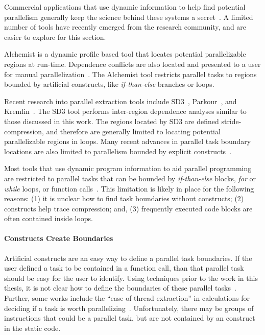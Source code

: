 {Commercial applications that use dynamic information to help find potential parallelism generally keep the science behind these systems a secret~\cite{cogswell:2010:eweek, vectorfabrics:11:ws}.  A limited number of tools have recently emerged from the research community, and are easier to explore for this section.

Alchemist is a dynamic profile based tool that locates potential parallelizable regions at run-time.  Dependence conflicts are also located and presented to a user for manual parallelization~\cite{zhang:09:cgo}.  The Alchemist tool restricts parallel tasks to regions bounded by artificial constructs, like \textit{if-than-else} branches or loops.

Recent research into parallel extraction tools include SD3~\cite{minjang:10:micro}, Parkour~\cite{jeon:2011:hotpar}, and Kremlin~\cite{garcia:2011:pldi}. The SD3 tool performs inter-region dependence analyses similar to those discussed in this work.  The regions located by SD3 are defined stride-compression, and therefore are generally limited to locating potential parallelizable regions in loops.  Many recent advances in parallel task boundary locations are also limited to parallelism bounded by explicit constructs~\cite{jeon:2011:hotpar, garcia:2011:pldi}.

Most tools that use dynamic program information to aid parallel programming are restricted to parallel tasks that can be bounded by \textit{if-than-else} blocks, \textit{for} or \textit{while} loops, or function calls~\cite{zhang:09:cgo, minjang:10:micro, jeon:2011:hotpar, garcia:2011:pldi}.  This limitation is likely in place for the following reasons: (1) it is unclear how to find task boundaries without constructs; (2) constructs help trace compression; and, (3) frequently executed code blocks are often contained inside loops.

\noindent\paragraph{Constructs Create Boundaries}

Artificial constructs are an easy way to define a parallel task boundaries.  If the user defined a task to be contained in a function call, than that parallel task should be easy for the user to identify.  Using techniques prior to the work in this thesis, it is not clear how to define the boundaries of these parallel tasks~\cite{jeon:2011:hotpar, garcia:2011:pldi}.  Further, some works include the ``ease of thread extraction'' in calculations for deciding if a task is worth parallelizing~\cite{garcia:2011:pldi}. Unfortunately, there may be groups of instructions that could be a parallel task, but are not contained by an construct in the static code.

}
